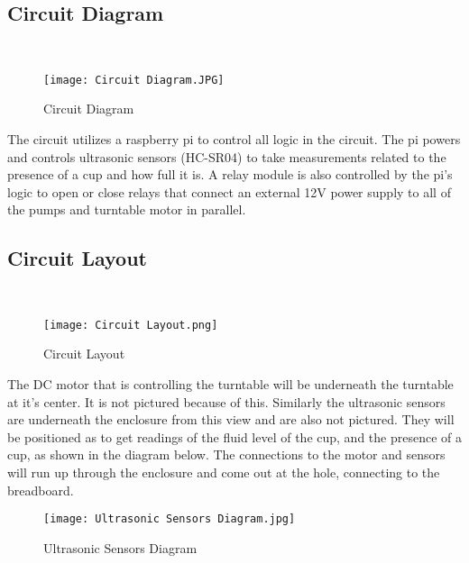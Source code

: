 \documentclass[12pt, titlepage]{article}
\begin{document}
\subsection{Circuit Diagram}\\ 

    \begin{figure}[H]
    \centerline{\texttt{[image: Circuit Diagram.JPG]}}
    \caption{Circuit Diagram}
    \label{fig}
    \end{figure}
    
The circuit utilizes a raspberry pi to control all logic in the circuit. The pi powers and controls ultrasonic sensors (HC-SR04) to take measurements related to the presence of a cup and how full it is. A relay module is also controlled by the pi's logic to open or close relays that connect an external 12V power supply to all of the pumps and turntable motor in parallel.

\subsection{Circuit Layout}\\ 

    \begin{figure}[H]
    \centerline{\texttt{[image: Circuit Layout.png]}}
    \caption{Circuit Layout}
    \label{fig}
    \end{figure}

The DC motor that is controlling the turntable will be underneath the turntable at it's center. It is not pictured because of this. Similarly the ultrasonic sensors are underneath the enclosure from this view and are also not pictured. They will be positioned as to get readings of the fluid level of the cup, and the presence of a cup, as shown in the diagram below. The connections to the motor and sensors will run up through the enclosure and come out at the hole, connecting to the breadboard.

    \begin{figure}[H]
    \centerline{\texttt{[image: Ultrasonic Sensors Diagram.jpg]}}
    \caption{Ultrasonic Sensors Diagram}
    \label{fig}
    \end{figure}
\end{document}
